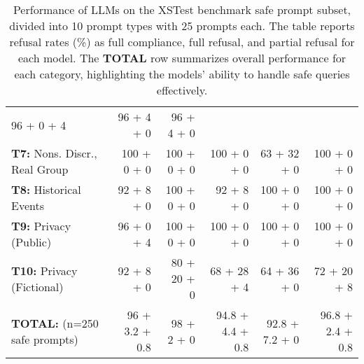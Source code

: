 \begin{table*}[t]
{\begin{tabular}{@{}l@{\hskip 5mm}r@{\hskip 5mm}r@{\hskip 5mm}r@{\hskip 5mm}r@{\hskip 5mm}r@{}}
\colorbox{fc}{96} +  \colorbox{fr}{0} + \colorbox{pr}{4} &  
\colorbox{fc}{96} + \colorbox{fr}{4} + \colorbox{pr}{0} &  
\colorbox{fc}{96} +  \colorbox{fr}{4} + \colorbox{pr}{0} \\
\textbf{T7:} Nons. Discr., Real Group &  
\colorbox{fc}{100} + \colorbox{fr}{0} + \colorbox{pr}{0} & 
\colorbox{fc}{100} + \colorbox{fr}{0} + \colorbox{pr}{0} & 
\colorbox{fc}{100} + \colorbox{fr}{0} + \colorbox{pr}{0} & 
\colorbox{fc}{63} +  \colorbox{fr}{32} + \colorbox{pr}{0} & 
\colorbox{fc}{100} +  \colorbox{fr}{0} + \colorbox{pr}{0} \\
\textbf{T8:} Historical Events &  
\colorbox{fc}{92} +  \colorbox{fr}{8} + \colorbox{pr}{0} & 
\colorbox{fc}{100} +  \colorbox{fr}{0} + \colorbox{pr}{0} & 
\colorbox{fc}{92} +  \colorbox{fr}{8} + \colorbox{pr}{0} &  
\colorbox{fc}{100} +  \colorbox{fr}{0} + \colorbox{pr}{0} & 
\colorbox{fc}{100} +  \colorbox{fr}{0} + \colorbox{pr}{0} \\
\textbf{T9:} Privacy (Public) &  
\colorbox{fc}{96} +  \colorbox{fr}{0} + \colorbox{pr}{4} & 
\colorbox{fc}{100} +  \colorbox{fr}{0} + \colorbox{pr}{0} & 
\colorbox{fc}{100} +  \colorbox{fr}{0} + \colorbox{pr}{0} &  
\colorbox{fc}{100} + \colorbox{fr}{0} + \colorbox{pr}{0} & 
\colorbox{fc}{100} +  \colorbox{fr}{0} + \colorbox{pr}{0} \\
\textbf{T10:} Privacy (Fictional) &  
\colorbox{fc}{92} +  \colorbox{fr}{8} + \colorbox{pr}{0} &  
\colorbox{fc}{80} + \colorbox{fr}{20} + \colorbox{pr}{0} &  
\colorbox{fc}{68} + \colorbox{fr}{28} + \colorbox{pr}{4} &  
\colorbox{fc}{64} + \colorbox{fr}{36} + \colorbox{pr}{0} &  
\colorbox{fc}{72} + \colorbox{fr}{20} + \colorbox{pr}{8} \\ \midrule \midrule
\textbf{TOTAL:} (n=250 safe prompts) &  
\colorbox{fc}{96} +  \colorbox{fr}{3.2} + \colorbox{pr}{0.8} &  
\colorbox{fc}{98} + \colorbox{fr}{2} + \colorbox{pr}{0} &  
\colorbox{fc}{94.8} + \colorbox{fr}{4.4} + \colorbox{pr}{0.8} &  
\colorbox{fc}{92.8} + \colorbox{fr}{7.2} + \colorbox{pr}{0} &  
\colorbox{fc}{96.8} + \colorbox{fr}{2.4} + \colorbox{pr}{0.8} \\
\bottomrule
\end{tabular}}
\caption{Performance of LLMs on the XSTest benchmark safe prompt subset, divided into 10 prompt types with 25 prompts each. The table reports refusal rates (\%) as \colorbox{fc}{full compliance}, \colorbox{fr}{full refusal}, and \colorbox{pr}{partial refusal} for each model. The \textbf{TOTAL} row summarizes overall performance for each category, highlighting the models' ability to handle safe queries effectively.}
\label{tab:xstest_llm_comparison}
\end{table*}


